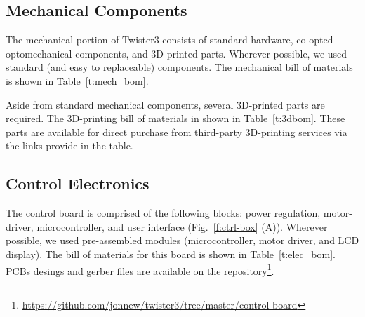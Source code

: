 \documentclass[11pt,a4paper]{article}
\begin{document}
\subsection{Mechanical Components}
The mechanical portion of Twister3 consists of standard hardware, co-opted
optomechanical components, and 3D-printed parts. Wherever possible, we used
standard (and easy to replaceable) components. The mechanical bill of materials
is shown in Table~\ref{t:mech_bom}.



Aside from standard mechanical components, several 3D-printed parts are
required. The 3D-printing bill of materials in shown in Table~\ref{t:3dbom}.
These parts are available for direct  purchase from third-party 3D-printing
services via the links provide in the table.



\subsection{Control Electronics}
The control board is comprised of the following blocks: power regulation,
motor-driver, microcontroller, and user interface (Fig.~\ref{f:ctrl-box} (A)).
Wherever possible, we used pre-assembled modules (microcontroller, motor
driver, and LCD display). The bill of materials for this board is shown in
Table~\ref{t:elec_bom}. PCBs desings and gerber files are available on the
repository\footnote{\url{https://github.com/jonnew/twister3/tree/master/control-board}}.









\medskip



\end{document}
